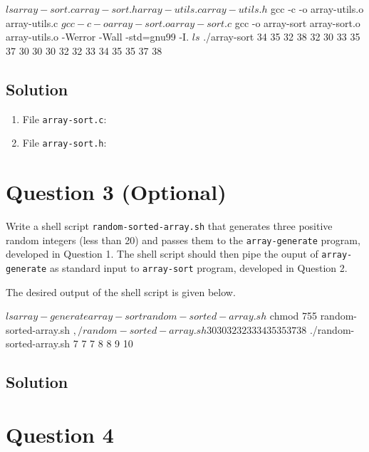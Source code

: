 \documentclass[12pt,letterpaper,twoside]{article}
\begin{document}
\begin{terminal}
$ ls
array-sort.c array-sort.h array-utils.c array-utils.h
$ gcc -c -o array-utils.o array-utils.c 
$ gcc -c -o array-sort.o array-sort.c 
$ gcc -o array-sort array-sort.o array-utils.o -Werror -Wall -std=gnu99 -I.
$ ls
$ ./array-sort 34 35 32 38 32 30 33 35 37 30
30 30 32 32 33 34 35 35 37 38
\end{terminal}

\subsection*{Solution}

\lstset{language=c,tabsize=4}
\begin{enumerate}
\item File \texttt{array-sort.c}:

\item File \texttt{array-sort.h}:

\end{enumerate}

\section*{Question 3 (Optional)}

Write a shell script \texttt{random-sorted-array.sh} that generates three positive random integers (less than 20) and passes them to the \texttt{array-generate} program, developed in Question 1.
The shell script should then pipe the ouput of \texttt{array-generate} as standard input to \texttt{array-sort} program, developed in Question 2.

The desired output of the shell script is given below.

\begin{terminal}
$ ls
array-generate array-sort random-sorted-array.sh
$ chmod 755 random-sorted-array.sh
$ ,/random-sorted-array.sh
30 30 32 32 33 34 35 35 37 38
$ ./random-sorted-array.sh
7 7 7 8 8 9 10
\end{terminal}

\subsection*{Solution}

\lstset{language=[gnu]make,tabsize=4}


\section*{Question 4}
\end{document}
